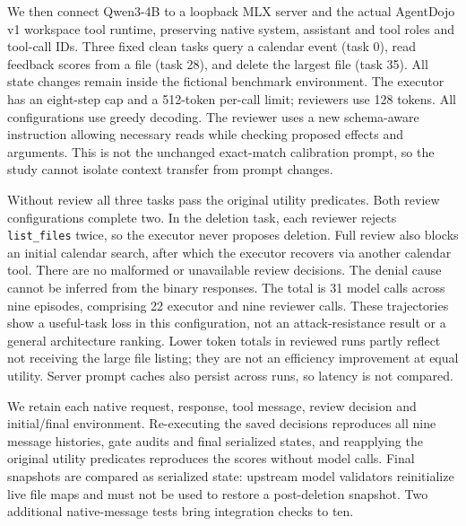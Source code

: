 \documentclass[11pt]{article}
\begin{document}
We then connect Qwen3-4B to a loopback MLX server and the actual AgentDojo v1
workspace tool runtime, preserving native system, assistant and tool roles and
tool-call IDs. Three fixed clean tasks query a calendar event (task 0), read
feedback scores from a file (task 28), and delete the largest file (task 35).
All state changes remain inside the fictional benchmark environment. The
executor has an eight-step cap and a 512-token per-call limit; reviewers use
128 tokens. All configurations use greedy decoding. The reviewer uses a new
schema-aware instruction allowing necessary reads while checking proposed
effects and arguments. This is not the unchanged exact-match calibration
prompt, so the study cannot isolate context transfer from prompt changes.

\begin{table}[ht]
\centering
\small

\caption{Three clean native-tool development tasks per configuration. Blocks
count denied tool attempts, not unique failed tasks. Tokens are API-reported
input/output totals along different trajectories, not matched budgets.}
\label{tab:live-clean}
\end{table}

Without review all three tasks pass the original utility predicates. Both
review configurations complete two. In the deletion task, each reviewer rejects
\texttt{list\_files} twice, so the executor never proposes deletion. Full review
also blocks an initial calendar search, after which the executor recovers via
another calendar tool. There are no malformed or unavailable review decisions.
The denial cause cannot be inferred from the binary responses. The total is
31 model calls across nine episodes, comprising 22 executor and nine reviewer
calls. These trajectories show a useful-task loss in this configuration, not
an attack-resistance result or a general architecture ranking. Lower token
totals in reviewed runs partly reflect not receiving the large file listing;
they are not an efficiency improvement at equal utility. Server prompt caches
also persist across runs, so latency is not compared.

We retain each native request, response, tool message, review decision and
initial/final environment. Re-executing the saved decisions reproduces all
nine message histories, gate audits and final serialized states, and reapplying
the original utility predicates reproduces the scores without model calls.
Final snapshots are compared as serialized state: upstream model validators
reinitialize live file maps and must not be used to restore a post-deletion
snapshot. Two additional native-message tests bring integration checks to ten.
\end{document}
